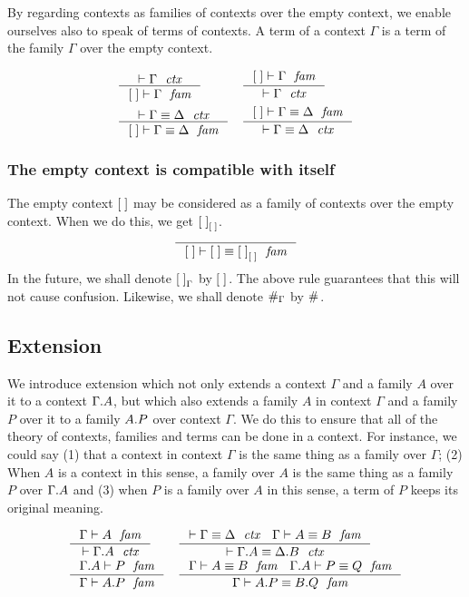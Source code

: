 By regarding contexts as families of contexts over the empty context, we
enable ourselves also to speak of terms of contexts. A term of a context
$\Gamma$ is a term of the family $\Gamma$ over the empty context. 

\begin{align}
& \inference
  { \jctx{\Gamma}
    }
  { \jfam{\emptyc}{\Gamma}
    } 
& & \inference
    { \jfam{\emptyc}{\Gamma}
      }
    { \jctx{\Gamma}
      }
    \\
& \inference
  { \jctxeq{\Gamma}{\Delta}
    }
  { \jfameq{\emptyc}{\Gamma}{\Delta}
    }
& & \inference
    { \jfameq{\emptyc}{\Gamma}{\Delta}
      }
    { \jctxeq{\Gamma}{\Delta}
      }
\end{align}

\subsubsection{The empty context is compatible with itself}
The empty context $\emptyc$ may be considered as a family of contexts over the empty
context. When we do this, we get $\emptyf[\emptyc]$.
\begin{equation}
\inference
  { }
  { \jfameq
      {\emptyc}
      {\emptyc}
      {\emptyf[\emptyc]}
    }
\end{equation}
In the future, we shall denote $\emptyf[\Gamma]$ by $\emptyf$. The above rule
guarantees that this will not cause confusion. Likewise, we shall denote
$\emptytm[\Gamma]$ by $\emptytm$.

\subsection{Extension}
We introduce extension which not only extends a context $\Gamma$ and a family
$A$ over it to a context $\ctxext{\Gamma}{A}$, but which also extends a family $A$
in context $\Gamma$ and a family $P$ over it to a family $\ctxext{A}{P}$ over context
$\Gamma$. We do this to ensure that all of the theory of contexts, families and
terms can be done in a context.
For instance, we could say (1) that a context in context $\Gamma$ is the same thing
as a family over $\Gamma$; (2) When $A$ is a context in this sense, a family over
$A$ is the same thing as a family $P$ over $\ctxext{\Gamma}{A}$ and 
(3) when $P$ is a family over $A$ in this sense, a term of $P$ keeps its original meaning.

\begin{align}
& \inference
  { \jfam{\Gamma}{A}
    }
  { \jctx{\ctxext{\Gamma}{A}}
    }
& & \inference
    { \jctxeq{\Gamma}{\Delta}
      \jfameq{\Gamma}{A}{B}
      }
    { \jctxeq{\ctxext{\Gamma}{A}}{\ctxext{\Delta}{B}}
      }
    \\
& \inference
  { \jfam{{\Gamma}{A}}{P}
    }
  { \jfam{\Gamma}{\ctxext{A}{P}}
    }
& & \inference
    { \jfameq{\Gamma}{A}{B} 
      \jfameq{{\Gamma}{A}}{P}{Q}
      }
    { \jfameq{\Gamma}{\ctxext{A}{P}}{\ctxext{B}{Q}}
      }
\end{align}

